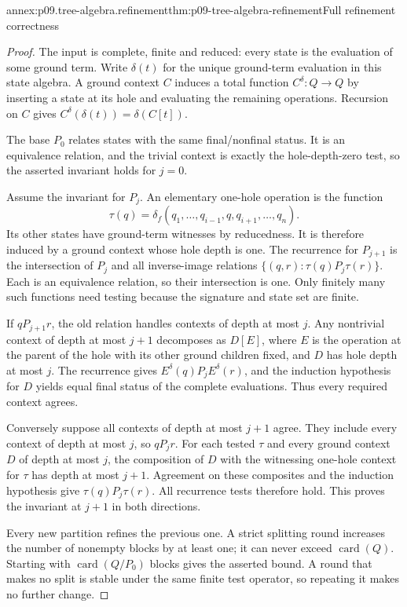 \begin{annexitem}{annex:p09.tree-algebra.refinement}{thm:p09-tree-algebra-refinement}{Full refinement correctness}
\begin{proof}
The input is complete, finite and reduced: every state is the evaluation
of some ground term. Write \(\delta(t)\) for the unique ground-term
evaluation in this state algebra. A ground context \(C\) induces a total function
\(C^\delta:Q\to Q\) by inserting a state at its hole and evaluating
the remaining operations. Recursion on \(C\) gives
\(C^\delta(\delta(t))=\delta(C[t])\).

The base \(P_0\) relates states with the same final/nonfinal status.
It is an equivalence relation, and the trivial context is exactly
the hole-depth-zero test, so the asserted invariant holds for \(j=0\).

Assume the invariant for \(P_j\). An elementary one-hole operation
is the function
\[
 \tau(q)=\delta_f(q_1,\ldots,q_{i-1},q,q_{i+1},\ldots,q_n).
\]
Its other states have ground-term witnesses by reducedness. It is
therefore induced by a ground context whose hole depth is one.
The recurrence for \(P_{j+1}\) is the intersection of \(P_j\)
and all inverse-image relations
\(\{(q,r):\tau(q)P_j\tau(r)\}\).
Each is an equivalence relation, so their intersection is one.
Only finitely many such functions need testing because the signature
and state set are finite.

If \(qP_{j+1}r\), the old relation handles contexts of depth at
most \(j\). Any nontrivial context of depth at most \(j+1\) decomposes
as \(D[E]\), where \(E\) is the operation at the parent of the
hole with its other ground children fixed, and \(D\) has hole depth
at most \(j\). The recurrence gives
\(E^\delta(q)P_jE^\delta(r)\), and the induction hypothesis for
\(D\) yields equal final status of the complete evaluations.
Thus every required context agrees.

Conversely suppose all contexts of depth at most \(j+1\) agree.
They include every context of depth at most \(j\), so \(qP_jr\).
For each tested \(\tau\) and every ground context \(D\) of depth
at most \(j\), the composition of \(D\) with the witnessing
one-hole context for \(\tau\) has depth at most \(j+1\).
Agreement on these composites and the induction hypothesis give
\(\tau(q)P_j\tau(r)\).
All recurrence tests therefore hold. This proves the invariant at
\(j+1\) in both directions.

Every new partition refines the previous one. A strict splitting round
increases the number of nonempty blocks by at least one; it can never
exceed \(\operatorname{card}(Q)\). Starting with
\(\operatorname{card}(Q/P_0)\) blocks gives the asserted bound.
A round that makes no split is stable under the same finite test
operator, so repeating it makes no further change.


\end{proof}
\end{annexitem}
